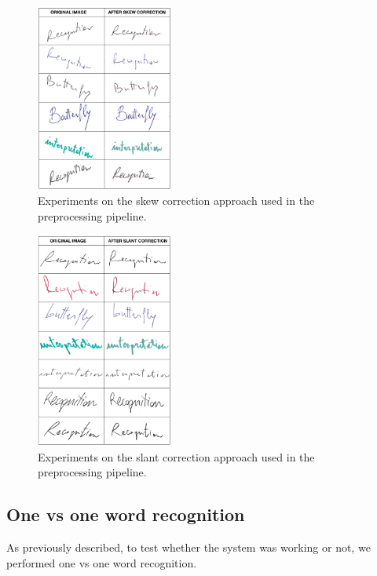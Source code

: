 \documentclass[conference]{IEEEtran}
\begin{document}
\begin{figure}
 \centering
\includegraphics[width=0.4\textwidth]{skew_images.png}
\caption{Experiments on the skew correction approach used in the preprocessing pipeline.}
\label{fig:skew}
\end{figure}

\begin{figure}
 \centering
\includegraphics[width=0.4\textwidth]{slant_images.png}
\caption{Experiments on the slant correction approach used in the preprocessing pipeline.}
\label{fig:slant}
\end{figure}

\subsection{One vs one word recognition} \label{SubS:1vs1}
As previously described, to test whether the system was working or not, we performed one vs one word recognition. 
\end{document}

